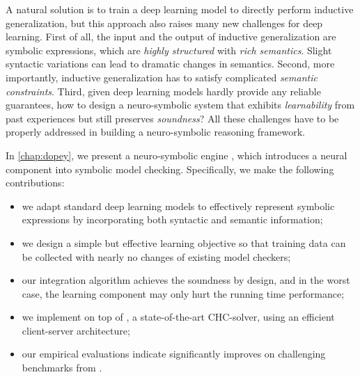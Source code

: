 A natural solution is to train a deep learning model to directly perform inductive generalization, but this approach also raises many new challenges for deep learning. 
First of all, the input and the output of inductive generalization are symbolic expressions, which are \textit{highly structured} with \textit{rich semantics}. 
Slight syntactic variations can lead to dramatic changes in semantics.
Second, more importantly, inductive generalization has to satisfy complicated \textit{semantic constraints}. 
Third, given deep learning models hardly provide any reliable guarantees, how to design a neuro-symbolic system that exhibits \textit{learnability} from past experiences but still preserves \textit{soundness}?
All these challenges have to be properly addressed in building a neuro-symbolic reasoning framework. 

In \cref{chap:dopey}, we present a neuro-symbolic engine \dpy, which introduces a neural component into symbolic model checking. Specifically, we make the following contributions: 
\begin{itemize}
    \item we adapt standard deep learning models to effectively represent symbolic expressions by incorporating both syntactic and semantic information;
    \item we design a simple but effective learning objective so that training data can be collected with nearly no changes of existing model checkers; 
    \item our integration algorithm achieves the soundness by design, and in the worst case, the learning component may only hurt the running time performance; 
    \item we implement \dpy on top of \spc, a state-of-the-art CHC-solver, using an efficient client-server architecture;
    \item our empirical evaluations indicate \dpy significantly improves \spc on 
    challenging benchmarks from \chccomp.
\end{itemize}
